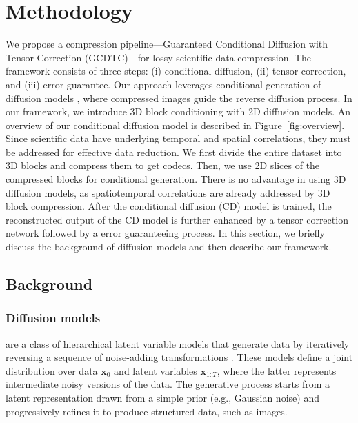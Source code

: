 \section{Methodology}

We propose a compression pipeline---Guaranteed Conditional Diffusion with Tensor Correction (GCDTC)---for lossy scientific data compression. The framework consists of three steps: (i) conditional diffusion, (ii) tensor correction, and (iii) error guarantee. Our approach leverages conditional generation of diffusion models \cite{Yang2023cd}, where compressed images guide the reverse diffusion process. In our framework, we introduce 3D block conditioning with 2D diffusion models. An overview of our conditional diffusion model is described in Figure~\ref{fig:overview}. Since scientific data have underlying temporal and spatial correlations, they must be addressed for effective data reduction. We first divide the entire dataset into 3D blocks and compress them to get codecs. Then, we use 2D slices of the compressed blocks for conditional generation. There is no advantage in using 3D diffusion models, as spatiotemporal correlations are already addressed by 3D block compression. After the conditional diffusion (CD) model is trained, the reconstructed output of the CD model is further enhanced by a tensor correction network followed by a error guaranteeing process. In this section, we briefly discuss the background of diffusion models and then describe our framework.


\subsection{Background}
\subsubsection{Diffusion models} are a class of hierarchical latent variable models that generate data by iteratively reversing a sequence of noise-adding transformations \cite{Sohl2015,Song2019,Ho2020,Song2021}. These models define a joint distribution over data $\boldsymbol{x}_0$ and latent variables $\boldsymbol{x}_{1:T}$, where the latter represents intermediate noisy versions of the data. The generative process starts from a latent representation drawn from a simple prior (e.g., Gaussian noise) and progressively refines it to produce structured data, such as images.

